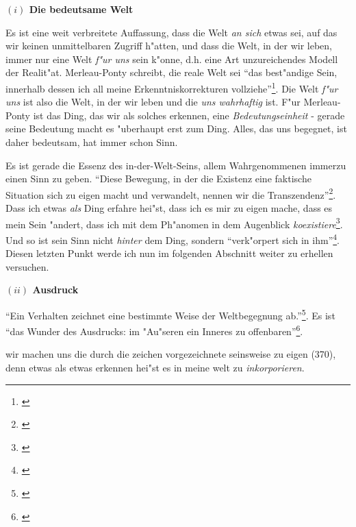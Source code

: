 \documentclass[a4paper, 12pt]{article}
\begin{document}
\begin{onehalfspace}
\vspace{5mm}

\noindent\textbf{$(i)$ Die bedeutsame Welt}

\noindent Es ist eine weit verbreitete Auffassung, dass die Welt \emph{an sich} etwas sei, auf das wir keinen unmittelbaren Zugriff h"atten, und dass die Welt, in der wir leben, immer nur eine Welt \emph{f"ur uns} sein k"onne, d.h. eine Art unzureichendes Modell der Realit"at. Merleau-Ponty schreibt, die reale Welt sei "`das best"andige Sein, innerhalb dessen ich all meine Erkenntniskorrekturen vollziehe"'\footnote{\cite[S. 379]{merleau1966phanomenologie}}. Die Welt \emph{f"ur uns} ist also die Welt, in der wir leben und die \emph{uns wahrhaftig} ist. F"ur Merleau-Ponty ist das Ding, das wir als solches erkennen, eine \emph{Bedeutungseinheit} - gerade seine Bedeutung macht es "uberhaupt erst zum Ding. Alles, das uns begegnet, ist daher bedeutsam, hat immer schon Sinn.

Es ist gerade die Essenz des in-der-Welt-Seins, allem Wahrgenommenen immerzu einen Sinn zu geben. "`Diese Bewegung, in der die Existenz eine faktische Situation sich zu eigen macht und verwandelt, nennen wir die Transzendenz"'\footnote{\cite[S. 202]{merleau1966phanomenologie}}. Dass ich etwas \emph{als} Ding erfahre hei"st, dass ich es mir zu eigen mache, dass es mein Sein "andert, dass ich mit dem Ph"anomen in dem Augenblick \emph{koexistiere}\footnote{\cite[vgl.][S. 368]{merleau1966phanomenologie}}. Und so ist sein Sinn nicht \emph{hinter} dem Ding, sondern "`verk"orpert sich in ihm"'\footnote{\cite[S. 370]{merleau1966phanomenologie}}. Diesen letzten Punkt werde ich nun im folgenden Abschnitt weiter zu erhellen versuchen. 

\vspace{5mm}

\noindent\textbf{$(ii)$ Ausdruck}

\noindent "`Ein Verhalten zeichnet eine bestimmte Weise der Weltbegegnung ab."'\footnote{\cite[S. 370]{merleau1966phanomenologie}}. Es ist "`das Wunder des Ausdrucks: im "Au"seren ein Inneres zu offenbaren"'\footnote{\cite[S. 370]{merleau1966phanomenologie}}.

wir machen uns die durch die zeichen vorgezeichnete seinsweise zu eigen (370), denn etwas als etwas erkennen hei"st es in meine welt zu \emph{inkorporieren}.



\end{onehalfspace}
\end{document}
